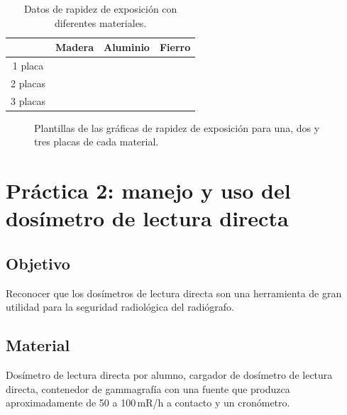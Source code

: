 \begin{table}[htbp]
\centering
\caption{Datos de rapidez de exposición con diferentes materiales.}
\begin{tabular}{c c c c}
\hline
 & Madera & Aluminio & Fierro \\
\hline
1 placa & & & \\
2 placas & & & \\
3 placas & & & \\
\hline
\end{tabular}
\end{table}

\begin{figure}[htbp]
  \centering
  \caption{Plantillas de las gráficas de rapidez de exposición para una, dos y tres placas de cada material.}
  \label{fig:practica1-graficas}
\end{figure}

\section{Práctica 2: manejo y uso del dosímetro de lectura directa}

\subsection*{Objetivo}
Reconocer que los dosímetros de lectura directa son una herramienta de gran utilidad para la seguridad radiológica del radiógrafo.

\subsection*{Material}
Dosímetro de lectura directa por alumno, cargador de dosímetro de lectura directa, contenedor de gammagrafía con una fuente que produzca aproximadamente de 50 a 100\,mR/h a contacto y un cronómetro.

